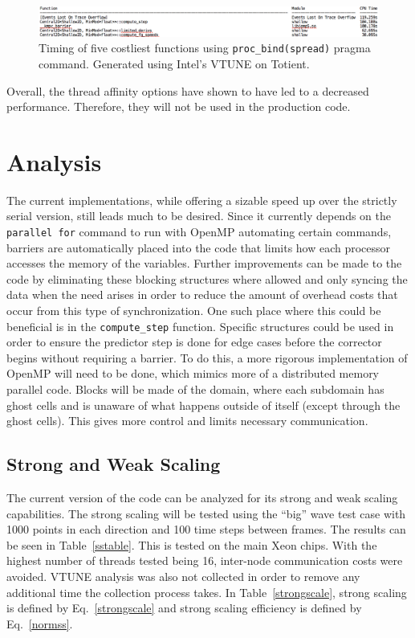 \documentclass[12pt]{article}
\begin{document}
		\begin{figure}[h]
			\begin{center}
				\includegraphics[width=0.8\columnwidth]{bindspread}
				\caption{Timing of five costliest functions using \texttt{proc\_bind(spread)} pragma command. Generated using Intel's VTUNE on Totient.}
				\label{bindspread}
			\end{center}
		\end{figure}
		
		\noindent Overall, the thread affinity options have shown to have led to a decreased performance. Therefore, they will not be used in the production code.
		
\section{Analysis}
The current implementations, while offering a sizable speed up over the strictly serial version, still leads much to be desired. Since it currently depends on the \texttt{parallel for} command to run with OpenMP automating certain commands, barriers are automatically placed into the code that limits how each processor accesses the memory of the variables. Further improvements can be made to the code by eliminating these blocking structures where allowed and only syncing the data when the need arises in order to reduce the amount of overhead costs that occur from this type of synchronization. One such place where this could be beneficial is in the \texttt{compute\_step} function. Specific structures could be used in order to ensure the predictor step is done for edge cases before the corrector begins without requiring a barrier. To do this, a more rigorous implementation of OpenMP will need to be done, which mimics more of a distributed memory parallel code. Blocks will be made of the domain, where each subdomain has ghost cells and is unaware of what happens outside of itself (except through the ghost cells). This gives more control and limits necessary communication.

\subsection{Strong and Weak Scaling}
The current version of the code can be analyzed for its strong and weak scaling capabilities. The strong scaling will be tested using the ``big'' wave test case with 1000 points in each direction and 100 time steps between frames. The results can be seen in Table~\ref{sstable}. This is tested on the main Xeon chips. With the highest number of threads tested being 16, inter-node communication costs were avoided. VTUNE analysis was also not collected in order to remove any additional time the collection process takes. In Table~\ref{strongscale}, strong scaling is defined by Eq.~\ref{strongscale} and strong scaling efficiency is defined by Eq.~\ref{normss}.
\end{document}
